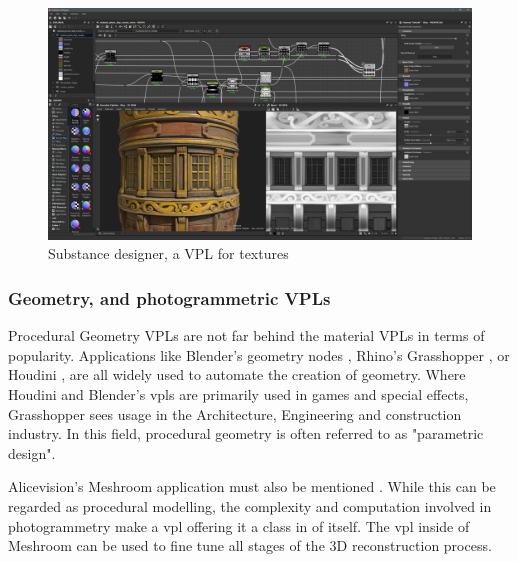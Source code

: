 \begin{figure}
  \centering
  \graphicspath{{../../assets/images/3/}}
  \includegraphics[width=\linewidth]{substance-designer.jpg}
  \caption[Geometry VPL]{Substance designer, a VPL for textures \citep{rutten_grasshopper_2012}}
  \label{fig:texture-vpl}
\end{figure}

\subsubsection*{Geometry, and photogrammetric VPLs}

Procedural Geometry \ac{VPL}s are not far behind the material \ac{VPL}s in terms of popularity.
Applications like Blender's geometry nodes \citep{blender_foundation_geometry_2022}, Rhino's Grasshopper \citep{rutten_grasshopper_2012}, or Houdini \citep{sidefx_houdini_2022}, are all widely used to automate the creation of geometry. 
Where Houdini and Blender's vpls are primarily used in games and special effects, Grasshopper sees usage in the Architecture, Engineering and construction industry. 
In this field, procedural geometry is often referred to as "parametric design".

Alicevision's Meshroom application must also be mentioned \citep{alicevision_meshroom_2022}.
While this can be regarded as procedural modelling, the complexity and computation involved in photogrammetry make a vpl offering it a class in of itself. 
The vpl inside of Meshroom can be used to fine tune all stages of the 3D reconstruction process.

